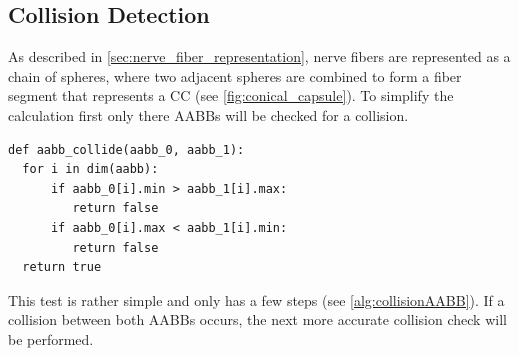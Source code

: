 \subsection{Collision Detection}
\label{sec:collisionDetection}
%
\begin{lstfloat}[!t]
\caption{Collision detection between two capsule objects. The distance as well as the points on the line segments is returned. A collision takes place if the distance is smaller than $\mathit{cone_a.r}+\mathit{cone_b.r} > d$. }
\label{alg:pseudocodeCollisionDetection}
\end{lstfloat}
%
As described in \cref{sec:nerve_fiber_representation}, nerve fibers are represented as a chain of spheres, where two adjacent spheres are combined to form a fiber segment that represents a \ac{CC} (see \cref{fig:conical_capsule}).
%
To simplify the calculation first only there \acp{AABB} will be checked for a collision.
%
\begin{lstfloat}[!tb]
\lstset{style=python}
\begin{lstlisting}[]
def aabb_collide(aabb_0, aabb_1):
  for i in dim(aabb):
      if aabb_0[i].min > aabb_1[i].max:
         return false
      if aabb_0[i].max < aabb_1[i].min:
         return false
  return true
\end{lstlisting}
\caption{Pseudocode collision between \acp{AABB}.}
\label{alg:collisionAABB}
\end{lstfloat}
%
This test is rather simple and only has a few steps (see \cref{alg:collisionAABB}).
If a collision between both \acp{AABB} occurs, the next more accurate collision check will be performed.
